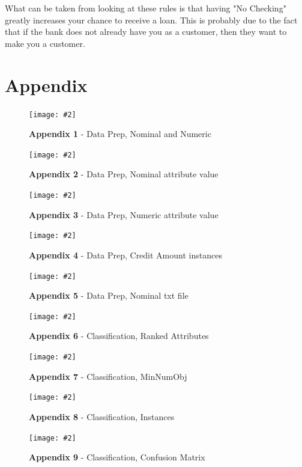 \documentclass[12pt, a4paper]{article}
\newcommand{\figuremacro}[5]{
    \begin{figure}[#1]
        \centering
        \texttt{[image: \#2]}
        \caption[#3]{\textbf{#3}#4}
        \label{fig:#2}
    \end{figure}
}
\begin{document}
    What can be taken from looking at these rules is that having "No Checking" greatly increases your chance to receive a loan. This is probably due to the fact that if the bank does not already have you as a customer, then they want to make you a customer.
    
    
    
    
    
    
    
    
    
 
	
	

	\section{Appendix}
	\figuremacro{h}{appendix1}{Appendix 1}{ - Data Prep, Nominal and Numeric}{1.0}
	\figuremacro{h}{appendix2}{Appendix 2}{ - Data Prep, Nominal attribute value}{1.0}
	\figuremacro{h}{appendix3}{Appendix 3}{ - Data Prep, Numeric attribute value}{1.0}
	\figuremacro{h}{appendix4}{Appendix 4}{ - Data Prep, Credit Amount instances}{1.0}
	\figuremacro{h}{appendix5}{Appendix 5}{ - Data Prep, Nominal txt file}{1.0}
	\figuremacro{h}{appendix6}{Appendix 6}{ - Classification, Ranked Attributes}{1.0}
	\figuremacro{h}{appendix7}{Appendix 7}{ - Classification, MinNumObj}{1.0}
	\figuremacro{h}{appendix8}{Appendix 8}{ - Classification, Instances}{1.0}
	\figuremacro{h}{appendix9}{Appendix 9}{ - Classification, Confusion Matrix}{1.0}
	
	


		
\end{document}
